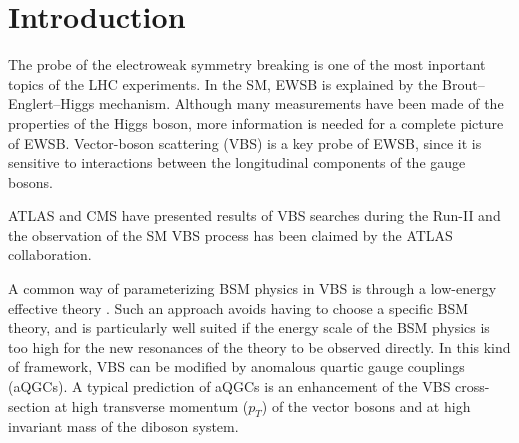\chapter{Introduction}
The probe of the electroweak symmetry breaking is one of the most inportant topics of the LHC experiments.
In the SM, EWSB is explained by the Brout–Englert–Higgs mechanism.%
Although many measurements have been made of the properties of the Higgs boson, more information is needed for a complete picture of EWSB. Vector-boson scattering (VBS) is a key probe of EWSB, since it is sensitive to interactions between the longitudinal components of the gauge bosons.

ATLAS and CMS have presented results of VBS searches during the Run-II \cite{STDM-2017-19,CMS-SMP-20-001} and the observation of the SM VBS process has been claimed by the ATLAS collaboration.

A common way of parameterizing BSM physics in VBS is through a low-energy effective theory \cite{Longhitano:1980tm}. Such an approach avoids having to choose a specific BSM theory, and is particularly well suited if the energy scale of the BSM physics is too high for the new resonances of the theory to be observed directly. In this kind of framework, VBS can be modified by anomalous quartic gauge couplings (aQGCs). 
A typical prediction of aQGCs is an enhancement of the VBS cross-section at high transverse momentum ($p_T$) of the vector bosons and at high invariant mass of the diboson system.


